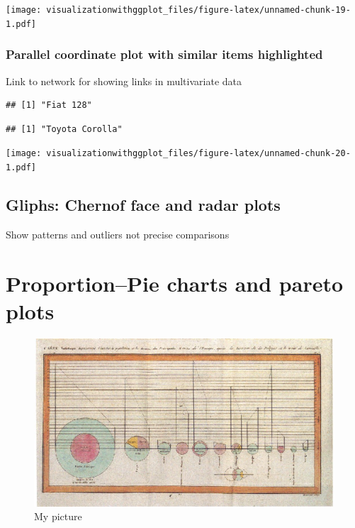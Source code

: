 \documentclass[]{krantz}
\theoremstyle{definition}
\theoremstyle{definition}
\theoremstyle{definition}
\theoremstyle{remark}
\begin{document}
\texttt{[image: visualizationwithggplot\_files/figure-latex/unnamed-chunk-19-1.pdf]}

\subsection{Parallel coordinate plot with similar items
highlighted}\label{parallel-coordinate-plot-with-similar-items-highlighted}

Link to network for showing links in multivariate data

\begin{verbatim}
## [1] "Fiat 128"
\end{verbatim}

\begin{verbatim}
## [1] "Toyota Corolla"
\end{verbatim}

\texttt{[image: visualizationwithggplot\_files/figure-latex/unnamed-chunk-20-1.pdf]}

\section{Gliphs: Chernof face and radar
plots}\label{gliphs-chernof-face-and-radar-plots}

Show patterns and outliers not precise comparisons

\cleardoublepage 

\chapter{Proportion--Pie charts and pareto plots}\label{Proportion}

\begin{figure}
\centering
\includegraphics{images/Playfair_piecharts.jpg}
\caption{My picture}
\end{figure}
\end{document}
